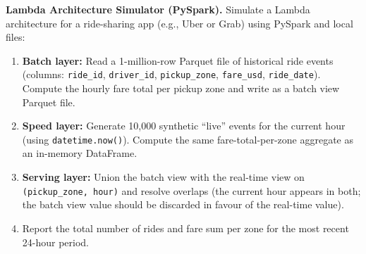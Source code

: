 \pe \textbf{Lambda Architecture Simulator (PySpark).}
Simulate a Lambda architecture for a ride-sharing app (e.g., Uber or Grab)
using PySpark and local files:
\begin{enumerate}[label=(\alph*)]
  \item \textbf{Batch layer:} Read a 1-million-row Parquet file of
        historical ride events (columns: \texttt{ride\_id},
        \texttt{driver\_id}, \texttt{pickup\_zone}, \texttt{fare\_usd},
        \texttt{ride\_date}). Compute the hourly fare total per pickup
        zone and write as a batch view Parquet file.
  \item \textbf{Speed layer:} Generate 10{,}000 synthetic ``live'' events
        for the current hour (using \texttt{datetime.now()}). Compute
        the same fare-total-per-zone aggregate as an in-memory DataFrame.
  \item \textbf{Serving layer:} Union the batch view with the real-time
        view on \texttt{(pickup\_zone, hour)} and resolve overlaps (the
        current hour appears in both; the batch view value should be
        discarded in favour of the real-time value).
  \item Report the total number of rides and fare sum per zone for the
        most recent 24-hour period.
\end{enumerate}

